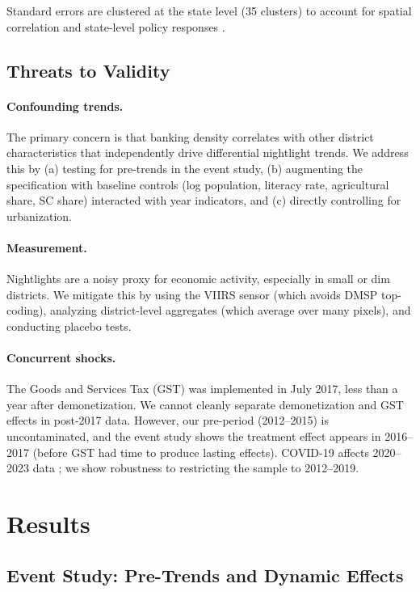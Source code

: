 \documentclass[12pt]{article}
\begin{document}
Standard errors are clustered at the state level (35 clusters) to account for spatial correlation and state-level policy responses \citep{cameron2008bootstrap}.

\subsection{Threats to Validity}

\paragraph{Confounding trends.} The primary concern is that banking density correlates with other district characteristics that independently drive differential nightlight trends. We address this by (a) testing for pre-trends in the event study, (b) augmenting the specification with baseline controls (log population, literacy rate, agricultural share, SC share) interacted with year indicators, and (c) directly controlling for urbanization.

\paragraph{Measurement.} Nightlights are a noisy proxy for economic activity, especially in small or dim districts. We mitigate this by using the VIIRS sensor (which avoids DMSP top-coding), analyzing district-level aggregates (which average over many pixels), and conducting placebo tests.

\paragraph{Concurrent shocks.} The Goods and Services Tax (GST) was implemented in July 2017, less than a year after demonetization. We cannot cleanly separate demonetization and GST effects in post-2017 data. However, our pre-period (2012--2015) is uncontaminated, and the event study shows the treatment effect appears in 2016--2017 (before GST had time to produce lasting effects). COVID-19 affects 2020--2023 data \citep{beyer2022examining}; we show robustness to restricting the sample to 2012--2019.


\section{Results}\label{sec:results}

\subsection{Event Study: Pre-Trends and Dynamic Effects}
\end{document}
